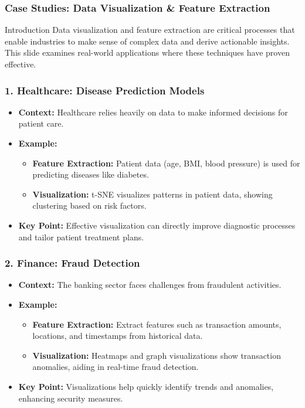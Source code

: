 \documentclass[aspectratio=169]{beamer}
\begin{document}
\begin{frame}[fragile]
    \frametitle{Case Studies: Data Visualization \& Feature Extraction}
    \begin{block}{Introduction}
        Data visualization and feature extraction are critical processes that enable industries to make sense of complex data and derive actionable insights. This slide examines real-world applications where these techniques have proven effective.
    \end{block}
\end{frame}

\begin{frame}[fragile]
    \frametitle{1. Healthcare: Disease Prediction Models}
    \begin{itemize}
        \item \textbf{Context:} Healthcare relies heavily on data to make informed decisions for patient care.
        \item \textbf{Example:}
        \begin{itemize}
            \item \textbf{Feature Extraction:} Patient data (age, BMI, blood pressure) is used for predicting diseases like diabetes.
            \item \textbf{Visualization:} t-SNE visualizes patterns in patient data, showing clustering based on risk factors.
        \end{itemize}
        \item \textbf{Key Point:} Effective visualization can directly improve diagnostic processes and tailor patient treatment plans.
    \end{itemize}
\end{frame}

\begin{frame}[fragile]
    \frametitle{2. Finance: Fraud Detection}
    \begin{itemize}
        \item \textbf{Context:} The banking sector faces challenges from fraudulent activities.
        \item \textbf{Example:}
        \begin{itemize}
            \item \textbf{Feature Extraction:} Extract features such as transaction amounts, locations, and timestamps from historical data.
            \item \textbf{Visualization:} Heatmaps and graph visualizations show transaction anomalies, aiding in real-time fraud detection.
        \end{itemize}
        \item \textbf{Key Point:} Visualizations help quickly identify trends and anomalies, enhancing security measures.
    \end{itemize}
\end{frame}
\end{document}
